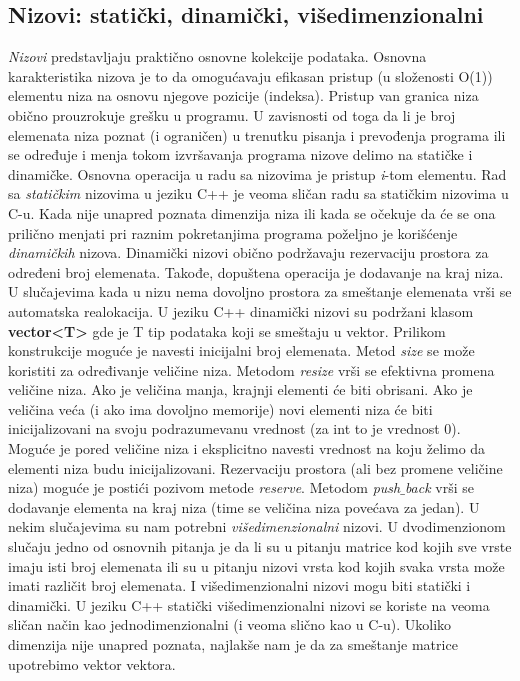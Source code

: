 \documentclass{article}
\begin{document}
\newpage
\subsection{Nizovi: statički, dinamički, višedimenzionalni}
\textit{Nizovi} predstavljaju praktično osnovne kolekcije podataka.
Osnovna karakteristika nizova je to da omogućavaju efikasan pristup (u složenosti O(1)) elementu niza na
osnovu njegove pozicije (indeksa). Pristup van granica niza obično
prouzrokuje grešku u programu. U
zavisnosti od toga da li je broj elemenata niza poznat (i ograničen) u trenutku
pisanja i prevođenja programa ili se određuje i menja tokom izvršavanja programa
nizove delimo na statičke i dinamičke. Osnovna operacija u radu sa nizovima je
pristup \textit{i}-tom elementu.
\newline Rad sa \textit{statičkim} nizovima u jeziku C++ je veoma sličan radu sa statičkim nizovima u C-u.
\newline Kada nije unapred poznata dimenzija niza ili kada se očekuje da će se ona prilično
menjati pri raznim pokretanjima programa poželjno je korišćenje \textit{dinamičkih}
nizova. Dinamički nizovi obično podržavaju rezervaciju prostora za određeni broj
elemenata. Takođe, dopuštena operacija je
dodavanje na kraj niza. U slučajevima kada u nizu nema dovoljno prostora za
smeštanje elemenata vrši se automatska realokacija.
U jeziku C++ dinamički nizovi su podržani klasom \textbf{vector<T>} gde je T tip
podataka koji se smeštaju u vektor. Prilikom konstrukcije moguće je navesti
inicijalni broj elemenata. Metod \textit{size} se može koristiti za određivanje veličine niza. Metodom \textit{resize} vrši se efektivna promena
veličine niza. Ako je veličina manja, krajnji elementi će biti obrisani. Ako je
veličina veća (i ako ima dovoljno memorije) novi elementi niza će biti inicijalizovani na svoju podrazumevanu vrednost (za int to je vrednost 0). Moguće je
pored veličine niza i eksplicitno navesti vrednost na koju želimo da elementi niza
budu inicijalizovani. Rezervaciju prostora (ali bez promene veličine niza) moguće
je postići pozivom metode \textit{reserve}. Metodom \textit{push$\_$back} vrši se dodavanje
elementa na kraj niza (time se veličina niza povećava za jedan).
\newline U nekim slučajevima su nam potrebni \textit{višedimenzionalni} nizovi. U dvodimenzionom slučaju jedno od osnovnih pitanja je da li su u pitanju matrice kod kojih
sve vrste imaju isti broj elemenata ili su u pitanju nizovi vrsta kod kojih svaka
vrsta može imati različit broj elemenata. I višedimenzionalni nizovi mogu biti statički i dinamički. U jeziku C++ statički višedimenzionalni nizovi se koriste na veoma sličan način
kao jednodimenzionalni (i veoma slično kao u C-u). Ukoliko dimenzija nije unapred poznata, najlakše nam je da za smeštanje matrice
upotrebimo vektor vektora.
\end{document}
